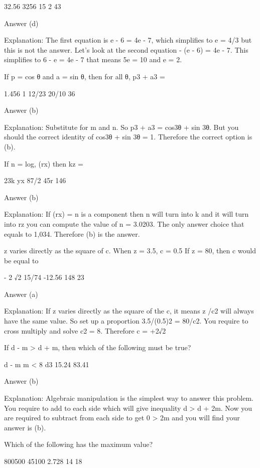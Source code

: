         32.56
        3256
        15
        2
        43 

    Answer (d)

    Explanation: The first equation is e - 6 = 4e - 7, which simplifies to e = 4/3 but this is not the answer. Let's look at the second equation - (e - 6) = 4e - 7. This simplifies to 6 - e = 4e - 7 that means 5e = 10 and e = 2.

    If p = cos θ and a = sin θ, then for all θ, p3 + a3 =

        1.456
        1
        12/23
        20/10
        36 

    Answer (b)

    Explanation: Substitute for m and n. So p3 + a3 = cos3θ + sin 3θ. But you should the correct identity of cos3θ + sin 3θ = 1. Therefore the correct option is (b).

    If n = log, (rx) then kz =

        23k
        yx
        87/2
        45r
        146 

    Answer (b)

    Explanation: If (rx) = n is a component then n will turn into k and it will turn into rz you can compute the value of n = 3.0203. The only answer choice that equals to 1,034. Therefore (b) is the answer.

    z varies directly as the square of c. When z = 3.5, c = 0.5 If z = 80, then c would be equal to

        - 2 √2
        15/74
        -12.56
        148
        23 

    Answer (a)

    Explanation: If z varies directly as the square of the c, it means z /c2 will always have the same value. So set up a proportion 3.5/(0.5)2 = 80/c2. You require to cross multiply and solve c2 = 8. Therefore c = +2√2

    If d - m > d + m, then which of the following must be true?

        d - m
        m < 8
        d3
        15.24
        83.41 

    Answer (b)

    Explanation: Algebraic manipulation is the simplest way to answer this problem. You require to add to each side which will give inequality d > d + 2m. Now you are required to subtract from each side to get 0 > 2m and you will find your answer is (b).

    Which of the following has the maximum value?

        800500
        45100
        2.728
        14
        18 

